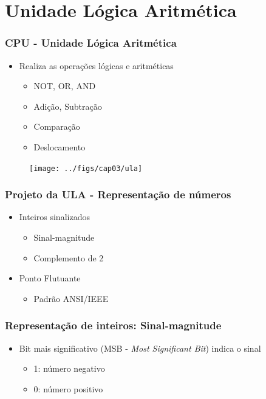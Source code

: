 \documentclass[aspectratio=169,
				xcolor=table]{beamer}
\begin{document}
	\section{Unidade Lógica Aritmética}
		\begin{frame}
			\frametitle{CPU - Unidade Lógica Aritmética}
			\begin{itemize}
				\item Realiza as operações lógicas e aritméticas
				\begin{itemize}
					\item NOT, OR, AND
					\item Adição, Subtração
					\item Comparação
					\item Deslocamento
				\end{itemize}				
			\end{itemize}
			\begin{flushright}
				\begin{minipage}{0.7\textwidth}
					\vspace{-5em}
					\begin{figure}
						\texttt{[image: ../figs/cap03/ula]} 
					\end{figure}
				\end{minipage}
			\end{flushright}

		\end{frame}
		
		\begin{frame}
			\frametitle{Projeto da ULA - Representação de números}
				\begin{itemize}
					\item Inteiros sinalizados
					\begin{itemize}
						\item Sinal-magnitude
						\item \alert{Complemento de 2}
					\end{itemize}
					\vspace{1em}
					\item Ponto Flutuante
					\begin{itemize}
						\item \alert{Padrão ANSI/IEEE}
					\end{itemize}
				\end{itemize}
		\end{frame}		

		\begin{frame}
			\frametitle{Representação de inteiros: Sinal-magnitude}
			\begin{itemize}
				\item Bit mais significativo (MSB - \textit{Most Significant Bit}) indica o sinal
				\begin{itemize}
					\item 1: número negativo
					\item 0: número positivo
				\end{itemize}
			\end{itemize}
		\end{frame}		
	
\end{document}
